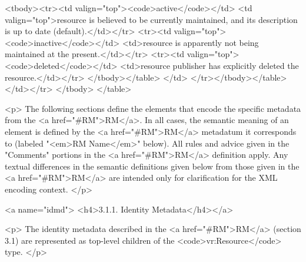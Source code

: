 \documentclass[11pt,a4paper]{ivoa}
\begin{document}
                 <tbody><tr><td valign="top"><code>active</code></td>
                     <td valign="top">resource is believed to be currently 
                      maintained, and its description is up to date
                      (default).</td></tr>
                 <tr><td valign="top"><code>inactive</code></td>
                     <td>resource is apparently not being maintained at the
                         present.</td></tr>
                 <tr><td valign="top"><code>deleted</code></td>
                     <td>resource publisher has explicitly deleted the
                         resource.</td></tr> 
              </tbody></table>
              </td> 
          </tr></tbody></table>
      </td></tr>
</tbody>
</table>

<p>
The following sections define the elements that encode the specific
metadata from the <a href="#RM">RM</a>.  In all cases, the semantic
meaning of an element is defined by the <a href="#RM">RM</a> metadatum
it corresponds to (labeled "<em>RM Name</em>" below).  All rules and
advice given in the "Comments" portions in the <a href="#RM">RM</a>
definition apply.  Any textual differences in the semantic definitions
given below from those given in the <a href="#RM">RM</a> are intended
only for clarification for the XML encoding context.  
</p>

<a name="idmd">
<h4>3.1.1. Identity Metadata</h4></a>

<p>
The identity metadata described in the <a href="#RM">RM</a> (section
3.1) are represented as top-level children of the
<code>vr:Resource</code> type.
</p>
\end{document}
